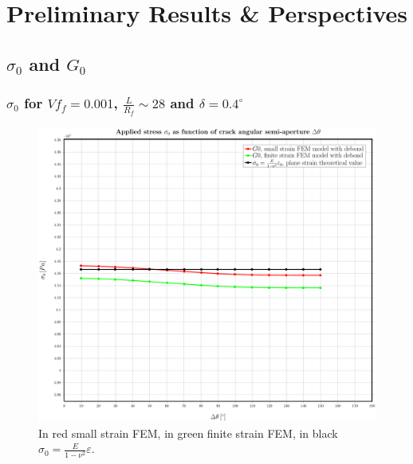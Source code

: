 \documentclass[first,firstsupp,lastsupp,handout,last,hyperref,table]{ETHclass}
\begin{document}
\section[Results]{Preliminary Results \& Perspectives}

\subsection{$\sigma_{0}$ and $G_{0}$}

\begin{frame}
\frametitle{\small $\sigma_{0}$ for $Vf_{f}=0.001$, $\frac{L}{R_{f}}\sim28$ and $\delta=0.4^{\circ}$}
\vspace{-0.5cm}
\centering
\captionsetup[figure]{font=scriptsize,labelfont=scriptsize}
\begin{figure}[!h]
\centering
\includegraphics[height=0.7\textheight]{2017-06-23_AbqRunSummary_SingleFiberEqRfSmallFiniteStrain_sigma-inf_Summary.pdf}
  \caption{\scriptsize In red small strain FEM, in green finite strain FEM, in black $\sigma_{0}=\frac{E}{1-\nu^{2}}\varepsilon$.}
  \label{fig:res1}
\end{figure}
\end{frame}
\end{document}
